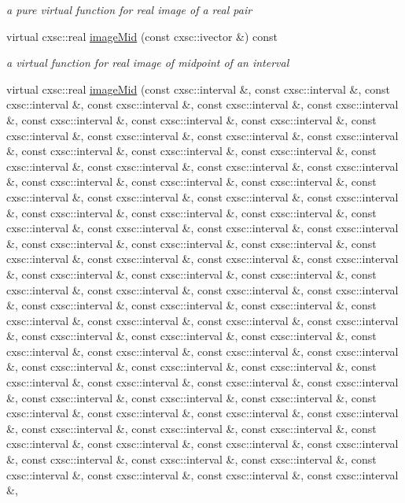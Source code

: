 \begin{DoxyCompactItemize}
\begin{DoxyCompactList}\small\item\em a pure virtual function for real image of a real pair \end{DoxyCompactList}\item 
virtual cxsc\-::real \hyperlink{classsubpavings_1_1MappedFobj1000D_a7bee736ff1f24be152519e4c79d6be32}{image\-Mid} (const cxsc\-::ivector \&) const 
\begin{DoxyCompactList}\small\item\em a virtual function for real image of midpoint of an interval \end{DoxyCompactList}\item 
virtual cxsc\-::real \hyperlink{classsubpavings_1_1MappedFobj1000D_a669894e5a1399345b2b652977d063c2e}{image\-Mid} (const cxsc\-::interval \&, const cxsc\-::interval \&, const cxsc\-::interval \&, const cxsc\-::interval \&, const cxsc\-::interval \&, const cxsc\-::interval \&, const cxsc\-::interval \&, const cxsc\-::interval \&, const cxsc\-::interval \&, const cxsc\-::interval \&, const cxsc\-::interval \&, const cxsc\-::interval \&, const cxsc\-::interval \&, const cxsc\-::interval \&, const cxsc\-::interval \&, const cxsc\-::interval \&, const cxsc\-::interval \&, const cxsc\-::interval \&, const cxsc\-::interval \&, const cxsc\-::interval \&, const cxsc\-::interval \&, const cxsc\-::interval \&, const cxsc\-::interval \&, const cxsc\-::interval \&, const cxsc\-::interval \&, const cxsc\-::interval \&, const cxsc\-::interval \&, const cxsc\-::interval \&, const cxsc\-::interval \&, const cxsc\-::interval \&, const cxsc\-::interval \&, const cxsc\-::interval \&, const cxsc\-::interval \&, const cxsc\-::interval \&, const cxsc\-::interval \&, const cxsc\-::interval \&, const cxsc\-::interval \&, const cxsc\-::interval \&, const cxsc\-::interval \&, const cxsc\-::interval \&, const cxsc\-::interval \&, const cxsc\-::interval \&, const cxsc\-::interval \&, const cxsc\-::interval \&, const cxsc\-::interval \&, const cxsc\-::interval \&, const cxsc\-::interval \&, const cxsc\-::interval \&, const cxsc\-::interval \&, const cxsc\-::interval \&, const cxsc\-::interval \&, const cxsc\-::interval \&, const cxsc\-::interval \&, const cxsc\-::interval \&, const cxsc\-::interval \&, const cxsc\-::interval \&, const cxsc\-::interval \&, const cxsc\-::interval \&, const cxsc\-::interval \&, const cxsc\-::interval \&, const cxsc\-::interval \&, const cxsc\-::interval \&, const cxsc\-::interval \&, const cxsc\-::interval \&, const cxsc\-::interval \&, const cxsc\-::interval \&, const cxsc\-::interval \&, const cxsc\-::interval \&, const cxsc\-::interval \&, const cxsc\-::interval \&, const cxsc\-::interval \&, const cxsc\-::interval \&, const cxsc\-::interval \&, const cxsc\-::interval \&, const cxsc\-::interval \&, const cxsc\-::interval \&, const cxsc\-::interval \&, const cxsc\-::interval \&, const cxsc\-::interval \&, const cxsc\-::interval \&, const cxsc\-::interval \&, const cxsc\-::interval \&, const cxsc\-::interval \&, const cxsc\-::interval \&, const cxsc\-::interval \&, const cxsc\-::interval \&, const cxsc\-::interval \&, const cxsc\-::interval \&, const cxsc\-::interval \&, const cxsc\-::interval \&, 
\end{DoxyCompactItemize}
